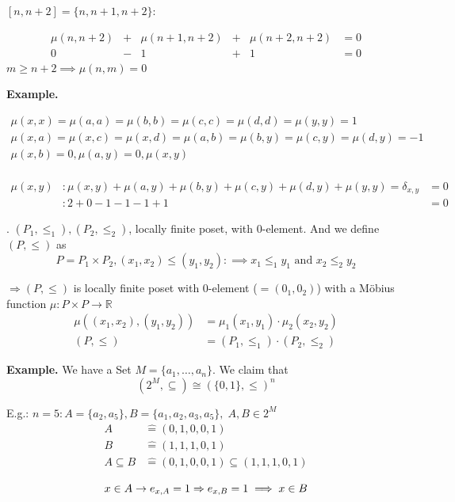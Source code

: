 $[n,n+2] = \{n,n+1, n+2\}:$

\[
\begin{matrix}
  \mu(n,n+2) & + & \mu(n+1,n+2) & + & \mu(n+2, n+2) & = 0 \\
  0 & -&1 &+&1 & = 0
\end{matrix}
\]
$ m \geq n+2 \implies \mu(n,m) = 0$

\textbf{Example.}

\begin{gather*}
    \mu(x,x) = \mu(a,a) = \mu(b,b) = \mu(c,c) = \mu(d,d) = \mu(y,y) = 1\\
    \mu(x,a) = \mu(x,c) = \mu(x,d) = \mu(a,b) = \mu(b,y) = \mu(c,y) = \mu(d,y) = -1\\
    \mu(x,b) = 0, \mu(a,y) = 0, \mu(x,y) \\
\end{gather*}

\begin{align*}
    \mu(x,y)&: \mu(x,y) + \mu(a,y) + \mu(b,y) + \mu(c,y) + \mu(d,y) + \mu(y,y) = \delta_{x,y} &= 0 \\
        &: 2 +0 -1 -1 -1 +1 &= 0
\end{align*}


\Theorem.
$(P_1, \leq_1), (P_2, \leq_2)$, locally finite poset, with 0-element.
And we define $(P, \leq)$ as
\[
  P = P_1 \times P_2, (x_1,x_2) \leq (y_1, y_2) :\implies x_1 \leq_1 y_1 \text{ and } x_2 \leq_2 y_2
\]

$\Rightarrow (P, \leq)$ is locally finite poset with 0-element ($=(0_1, 0_2)$) with a Möbius function $\mu: P\times P \rightarrow \mathbb{R}$
\begin{align*}
  \mu ( (x_1, x_2), (y_1,y_2)) &= \mu_1(x_1,y_1) \cdot \mu_2(x_2,y_2) \\
  (P, \leq) &= (P_1, \leq_1) \cdot (P_2, \leq_2)
\end{align*}

\textbf{Example.}
We have a Set $M = \{a_1, \ldots , a_n\}$. We claim that
\[
  (2^M, \subseteq) \cong ( \{0,1\}, \leq)^n
\]

E.g.: $n = 5: A = \{a_2,a_5\}, B= \{a_1, a_2, a_3, a_5\},\; A, B \in 2^M$
\begin{align*}
  A &\hat{=} (0,1,0,0,1) \\
  B &\hat{=} (1,1,1,0,1) \\
  A \subseteq B &\hat{=} (0,1,0,0,1) \subseteq (1,1,1,0,1) \\
\end{align*}
\[
  x \in A \rightarrow e_{x,A} = 1 \Rightarrow  e_{x,B} = 1 \implies x \in B\\
\]

